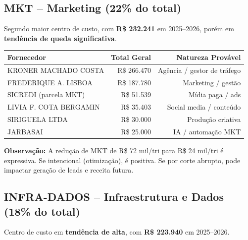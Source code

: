 \documentclass[12pt, a4paper]{article}
\newcommand{\reais}[1]{R\$ #1}
\begin{document}
\subsection{MKT -- Marketing (22\% do total)}

Segundo maior centro de custo, com \textbf{R\$ 232.241} em 2025--2026, porém em \textbf{tendência de queda significativa}.

\begin{table}[H]
    \centering
    \small
    \renewcommand{\arraystretch}{1.3}
    \begin{tabularx}{\textwidth}{X r r}
        \toprule
        \rowcolor{tableHeader} \textbf{Fornecedor} & \textbf{Total Geral} & \textbf{Natureza Provável} \\
        \midrule
        KRONER MACHADO COSTA & \reais{266.470} & Agência / gestor de tráfego \\
        FREDERIQUE A. LISBOA & \reais{187.780} & Marketing / gestão \\
        SICREDI (parcela MKT) & \reais{51.539} & Mídia paga / ads \\
        LIVIA F. COTA BERGAMIN & \reais{35.403} & Social media / conteúdo \\
        SIRIGUELA LTDA & \reais{30.000} & Produção criativa \\
        JARBASAI & \reais{25.000} & IA / automação MKT \\
        \bottomrule
    \end{tabularx}
\end{table}

\textcolor{warningOrange}{\textbf{Observação:}} A redução de MKT de R\$ 72 mil/tri para R\$ 24 mil/tri é expressiva. Se intencional (otimização), é positiva. Se por corte abrupto, pode impactar geração de leads e receita futura.

\subsection{INFRA-DADOS -- Infraestrutura e Dados (18\% do total)}

Centro de custo em \textbf{tendência de alta}, com \textbf{R\$ 223.940} em 2025--2026.
\end{document}
